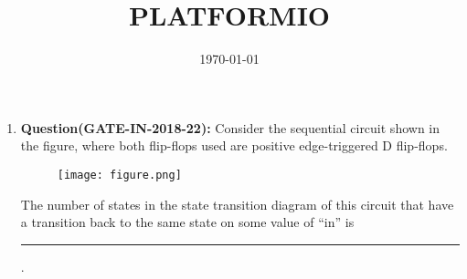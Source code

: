 \documentclass[12pt]{article}\usepackage{hyperref}
\begin{document}
\title{\textbf{PLATFORMIO}}\date{\today}
\maketitle\begin{enumerate}
    \item \textbf{Question(GATE-IN-2018-22):}    Consider the sequential circuit shown in the figure, where both flip-flops used are positive edge-triggered D flip-flops.
  \begin{figure}[!h]
        \centering        \texttt{[image: figure.png]}
        \caption{}        \label{fig:figure}
    \end{figure}
The number of states in the state transition diagram of this circuit that have a transition back to the same state on some value of ``in'' is \rule{30pt}{1pt}.
  \end{enumerate}
\end{document}
